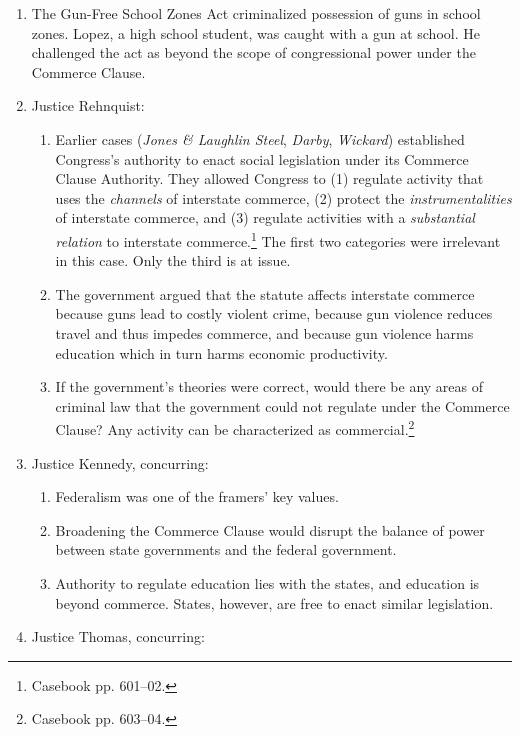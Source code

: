 \begin{enumerate}
    \item The Gun-Free School Zones Act criminalized possession of guns in 
    school zones. Lopez, a high school student, was caught with a gun at 
    school. He challenged the act as beyond the scope of congressional power 
    under the Commerce Clause.
    \item Justice Rehnquist:
    \begin{enumerate}
        \item Earlier cases (\emph{Jones \& Laughlin Steel}, \emph{Darby}, 
        \emph{Wickard}) established Congress's authority to enact social 
        legislation under its Commerce Clause Authority. They allowed Congress 
        to (1) regulate activity that uses the \emph{channels} of interstate 
        commerce, (2) protect the \emph{instrumentalities} of interstate 
        commerce, and (3) regulate activities with a \emph{substantial 
        relation} to interstate commerce.\footnote{Casebook pp. 601--02.} The 
        first two categories were irrelevant in this case. Only the third is 
        at issue.
        \item The government argued that the statute affects interstate 
        commerce because guns lead to costly violent crime, because gun 
        violence reduces travel and thus impedes commerce, and because gun 
        violence harms education which in turn harms economic productivity.
        \item If the government's theories were correct, would there be any 
        areas of criminal law that the government could not regulate under the 
        Commerce Clause? Any activity can be characterized as 
        commercial.\footnote{Casebook pp. 603--04.}
    \end{enumerate}
    \item Justice Kennedy, concurring:
    \begin{enumerate}
        \item Federalism was one of the framers' key values.
        \item Broadening the Commerce Clause would disrupt the balance of 
        power between state governments and the federal government.
        \item Authority to regulate education lies with the states, and 
        education is beyond commerce. States, however, are free to enact 
        similar legislation.
    \end{enumerate}
    \item Justice Thomas, concurring:

\end{enumerate}
